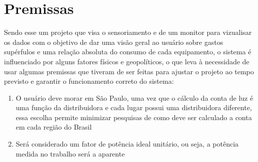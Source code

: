 \section{Premissas}

Sendo esse um projeto que visa o sensoriamento e de um monitor para vizualisar os dados com o objetivo de dar uma visão geral ao usuário sobre gastos supérfulos e uma relação absoluta do consumo de cada equipamento, o sistema é influenciado por alguns fatores físicos e geopolíticos, o que leva à necessidade de usar algumas premissas que tiveram de ser feitas para ajustar o projeto ao tempo previsto e garantir o funcionamento correto do sistema:

\begin{enumerate}
\item{O usuário deve morar em São Paulo, uma vez que o cálculo da conta de luz é uma função da distribuidora e cada lugar possui uma distribuidora diferente, essa escolha permite minimizar pesquisas de como deve ser calculado a conta em cada região do Brasil}
\item{Será considerado um fator de potência ideal unitário, ou seja, a potência medida no trabalho será a aparente}
\end{enumerate}